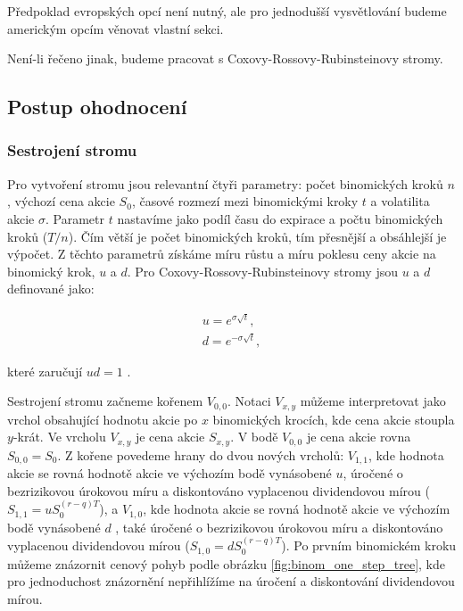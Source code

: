 \documentclass[male,czech,api_bc]{kitheses}
\begin{document}
  \parencites[s.~640]{BlackScholes1973}

  Předpoklad evropských opcí není nutný, ale pro jednodušší vysvětlování budeme americkým opcím věnovat vlastní sekci.

  Není-li řečeno jinak, budeme pracovat s Coxovy-Rossovy-Rubinsteinovy stromy.

 \subsection{Postup ohodnocení}

 \subsubsection{Sestrojení stromu}

 Pro vytvoření stromu jsou relevantní čtyři parametry: počet binomických kroků $n$, výchozí cena akcie $S_0$, časové rozmezí mezi binomickými kroky $t$ a volatilita akcie $\sigma$. Parametr $t$ nastavíme jako podíl času do expirace a počtu binomických kroků ($T/n$). Čím větší je počet binomických kroků, tím přesnější a obsáhlejší je výpočet.
 Z těchto parametrů získáme míru růstu a míru poklesu ceny akcie na binomický krok, $u$ a $d$. Pro Coxovy-Rossovy-Rubinsteinovy stromy jsou $u$ a $d$ definované jako:

 \begin{gather}
   u = e^{\sigma \sqrt{t}}, \\
   d = e^{-\sigma \sqrt{t}}, 
 \end{gather}

 které zaručují $ud = 1$ \parencites[s.~281]{Haug2007}.

 Sestrojení stromu začneme kořenem $V_{0, 0}$. Notaci $V_{x, y}$ můžeme interpretovat jako vrchol obsahující hodnotu akcie po $x$ binomických krocích, kde cena akcie stoupla $y$-krát. Ve vrcholu $V_{x, y}$ je cena akcie $S_{x, y}$. V bodě $V_{0, 0}$ je cena akcie rovna $S_{0, 0} = S_0$. Z kořene povedeme hrany do dvou nových vrcholů: $V_{1, 1}$, kde hodnota akcie se rovná hodnotě akcie ve výchozím bodě vynásobené $u$, úročené o bezrizikovou úrokovou míru a diskontováno vyplacenou dividendovou mírou ($S_{1, 1} = uS_0^{(r-q)T}$), a $V_{1, 0}$, kde hodnota akcie se rovná hodnotě akcie ve výchozím bodě vynásobené $d$ , také úročené o bezrizikovou úrokovou míru a diskontováno vyplacenou dividendovou mírou ($S_{1, 0} = dS_0^{(r-q)T}$).
 Po prvním binomickém kroku můžeme znázornit cenový pohyb podle obrázku \ref{fig:binom_one_step_tree}, kde pro jednoduchost znázornění nepřihlížíme na úročení a diskontování dividendovou mírou.
\end{document}
